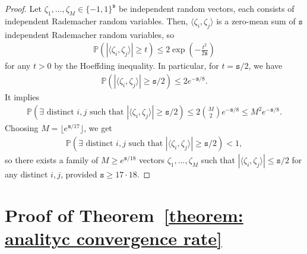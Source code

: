 \documentclass[11pt]{article}
\newcommand{\bbP}{\mathbb{P}}
\newcommand{\<}{\langle}
\renewcommand{\>}{\rangle}
\newcommand{\ts}{\mathtt{s}}
\theoremstyle{plain}
\theoremstyle{definition}
\theoremstyle{remark}
\begin{document}
{\begin{proof}
    Let $\zeta_1, \ldots, \zeta_M \in \{-1, 1\}^{\ts}$ be independent random vectors, each consists of independent Rademacher random variables. Then, $\langle \zeta_i, \zeta_j \rangle$ is a zero-mean sum of $\ts$ independent Rademacher random variables, so
    \begin{align*}
        \bbP \left ( |\langle \zeta_i, \zeta_j \rangle|  \ge t \right ) \le 2 \exp \left ( - \frac{t^2}{2\ts} \right )
    \end{align*}
    for any $t > 0$ by the Hoeffding inequality. In particular, for $t = \ts/2$, we have
    \begin{align*}
        \bbP \left (  |\langle \zeta_i, \zeta_j \rangle | \ge \ts/2 \right ) \le 2 e^{- \ts/8}.
    \end{align*}
    It implies
    \begin{align*}
        \bbP \left ( \exists \text{ distinct } i, j  \text{ such that } |\langle \zeta_i, \zeta_j \rangle | \ge \ts/2 \right ) \le 2 \binom{M}{2} e^{-\ts / 8} \le M^2 e^{-\ts / 8}.
    \end{align*}
    Choosing $M = \lfloor e^{\ts/17} \rfloor $, we get
    \begin{align*}
        \bbP \left ( \exists \text{ distinct } i, j  \text{ such that } |\langle \zeta_i, \zeta_j \rangle | \ge \ts/2 \right ) < 1,
    \end{align*}
    so there exists a family of $M \ge e^{\ts/ 18}$ vectors $\zeta_1, \ldots, \zeta_M$ such that $|\langle \zeta_i, \zeta_j \rangle| \le \ts/2$ for any distinct $i, j$, provided $\ts \ge 17 \cdot 18$.
\end{proof}





\section{Proof of Theorem~\ref{theorem: analityc convergence rate}}
\label{appendix: proof of analytic convergence rate}


}
\end{document}
